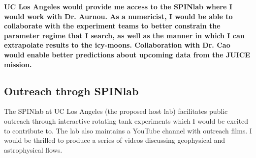 \documentclass[12pt]{article}
\begin{document}
\textbf{UC Los Angeles would provide me access to the SPINlab where I would work with Dr. Aurnou. As a numericist, I would be able to collaborate with the experiment teams to better constrain the parameter regime that I search, as well as the manner in which I can extrapolate results to the icy-moons. Collaboration with Dr. Cao would enable better predictions about upcoming data from the JUICE mission.}
\subsection*{Outreach throgh SPINlab}
The SPINlab at UC Los Angeles (the proposed host lab) facilitates public outreach through interactive rotating tank experiments which I would be excited to contribute to. The lab also maintains a YouTube channel with outreach films. I would be thrilled to produce a series of videos discussing geophysical and astrophysical flows.
\printbibliography
\end{document}
